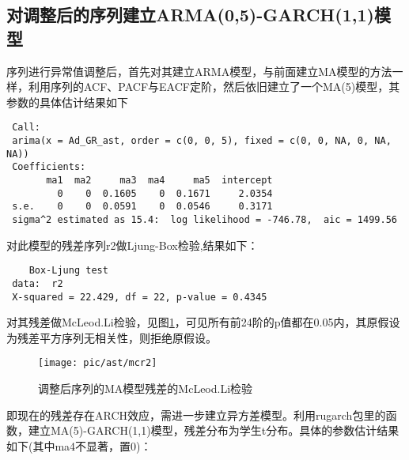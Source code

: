 \documentclass[10.5pt,onecolumn,a4paper]{article}%
\begin{document}
\subsection{对调整后的序列建立ARMA(0,5)-GARCH(1,1)模型}
序列进行异常值调整后，首先对其建立ARMA模型，与前面建立MA模型的方法一样，利用序列的ACF、PACF与EACF定阶，然后依旧建立了一个MA(5)模型，其参数的具体估计结果如下
\begin{framed}
\begin{verbatim} 
 Call:
 arima(x = Ad_GR_ast, order = c(0, 0, 5), fixed = c(0, 0, NA, 0, NA, NA))
 Coefficients:
       ma1  ma2     ma3  ma4     ma5  intercept
         0    0  0.1605    0  0.1671     2.0354
 s.e.    0    0  0.0591    0  0.0546     0.3171
 sigma^2 estimated as 15.4:  log likelihood = -746.78,  aic = 1499.56
\end{verbatim}
\end{framed}
对此模型的残差序列r2做Ljung-Box检验,结果如下：
\begin{framed}
\begin{verbatim}
 	Box-Ljung test
 data:  r2
 X-squared = 22.429, df = 22, p-value = 0.4345
\end{verbatim}
\end{framed}
对其残差做McLeod.Li检验，见图\ref{fig:mcr2}，可见所有前24阶的p值都在0.05内，其原假设为残差平方序列无相关性，则拒绝原假设。
\begin{figure}[h!]
	\centering
	\texttt{[image: pic/ast/mcr2]}
	\caption{调整后序列的MA模型残差的McLeod.Li检验}
	\label{fig:mcr2}
\end{figure}
即现在的残差存在ARCH效应，需进一步建立异方差模型。利用rugarch包里的函数，建立MA(5)-GARCH(1,1)模型，残差分布为学生t分布。具体的参数估计结果如下(其中ma4不显著，置0)：
\end{document}

